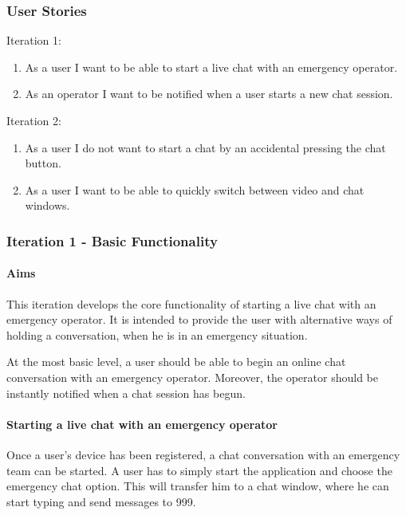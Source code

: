 \documentclass{article}
\begin{document}
		\subsubsection{User Stories}
		Iteration 1:
		\begin{enumerate}
		
\item As a user I want to be able to start a live chat with an emergency operator.
\item As an operator I want to be notified when a user starts a new chat session.

\end{enumerate}
Iteration 2:
\begin{enumerate}

\item As a user I do not want to start a chat by an accidental pressing the chat button.
\item As a user I want to be able to quickly switch between video and chat windows.

\end{enumerate}
		
		\pagebreak
		\subsubsection{Iteration 1 - Basic Functionality}
			\paragraph{Aims}
			This iteration develops the core functionality of starting a live chat with an emergency operator. It is intended to provide the user with alternative ways of holding a conversation, when he is in an emergency situation.

At the most basic level, a user should be able to begin an online chat conversation with an emergency operator. Moreover, the operator should be instantly notified when a chat session has begun. 

		\paragraph{Starting a live chat with an emergency operator}
		Once a user’s device has been registered, a chat conversation with an emergency team can be started. A user has to simply start the application and choose the emergency chat option. This will transfer him to a chat window, where he can start typing and send messages to 999. 
\end{document}
